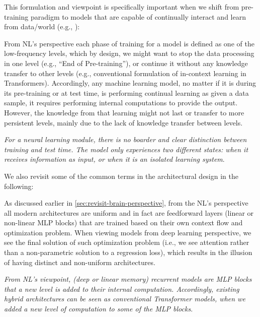 {This formulation and viewpoint is specifically important when we shift from pre-training paradigm to models that are capable of continually interact and learn from data/world (e.g., \citet{sutton2025oak}):




From NL's perspective each phase of training for a model is defined as one of the low-frequency levels, which by design, we might want to stop the data processing in one level (e.g., ``End of Pre-training''), or continue it without any knowledge transfer to other levels (e.g., conventional formulation of in-context learning in Transformers). Accordingly, any machine learning model, no matter if it is during its pre-training or at test time, is performing continual learning as given a data sample, it requires performing internal computations to provide the output. However, the knowledge from that learning might not last or transfer to more persistent levels, mainly due to the lack of knowledge transfer between levels. 


\begin{myboxismall}
    \textit{For a neural learning module, there is no boarder and clear distinction between training and test time. The model only experiences two different states: when it receives information as input, or when it is an isolated learning system}.
\end{myboxismall}




We also revisit some of the common terms in the architectural design in the following:







As discussed earlier in \autoref{sec:revisit-brain-perspective}, from the NL's perspective all modern architectures are uniform and in fact are feedforward layers (linear or non-linear MLP blocks) that are trained based on their own context flow and optimization problem. When viewing models from deep learning perspective, we see the final solution of such optimization problem (i.e., we see attention rather than a non-parametric solution to a regression loss), which results in the illusion of having distinct and non-uniform architectures.


\begin{myboxismall}
    \textit{From NL's viewpoint, (deep or linear memory) recurrent models are MLP blocks that a new level is added to their internal computation. Accordingly, existing hybrid architectures can be seen as conventional Transformer models, when we added a new level of computation to some of the MLP blocks}.
\end{myboxismall}

}
